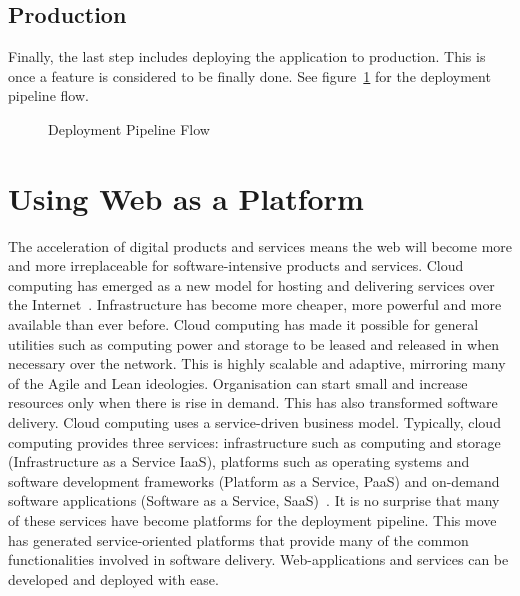 \documentclass[english]{tktltiki2}
\begin{document}
\subsection{Production}

Finally, the last step includes deploying the application to production. This is once a feature is considered to be finally done. See figure~\ref{figure:deployment-pipeline-flow} for the deployment pipeline flow.

\begin{figure}[h!]

    \vspace{1cm}
    \centering


    \caption{Deployment Pipeline Flow}
    \label{figure:deployment-pipeline-flow}

\end{figure}


\section{Using Web as a Platform}

The acceleration of digital products and services means the web will become more and more irreplaceable for software-intensive products and services. Cloud computing has emerged as a new model for hosting and delivering services over the Internet~\cite{ZCB10}. Infrastructure has become more cheaper, more powerful and more available than ever before. Cloud computing has made it possible for general utilities such as computing power and storage to be leased and released in when necessary over the network. This is highly scalable and adaptive, mirroring many of the Agile and Lean ideologies. Organisation can start small and increase resources only when there is rise in demand. This has also transformed software delivery. Cloud computing uses a service-driven business model. Typically, cloud computing provides three services: infrastructure such as computing and storage (Infrastructure as a Service IaaS), platforms such as operating systems and software development frameworks (Platform as a Service, PaaS) and on-demand software applications (Software as a Service, SaaS)~\cite{ZCB10}. It is no surprise that many of these services have become platforms for the deployment pipeline. This move has generated service-oriented platforms that provide many of the common functionalities involved in software delivery. Web-applications and services can be developed and deployed with ease.
\end{document}
